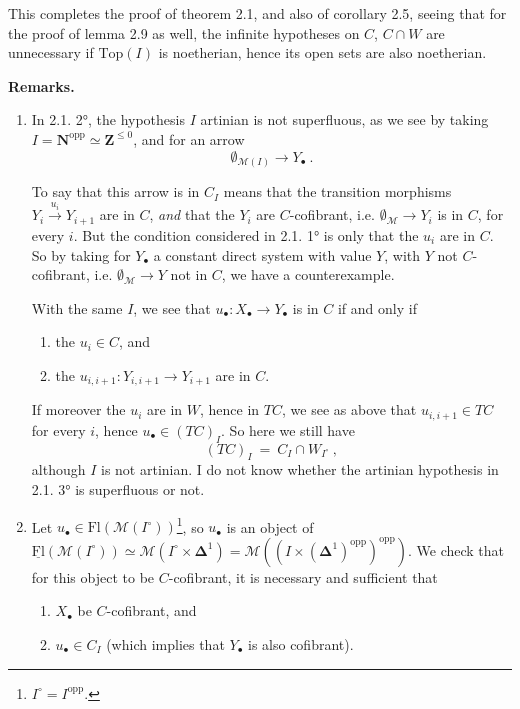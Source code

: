 \documentclass[11pt]{article}
\newcommand{\printedpage}[1]{\marginpar{\footnotesize p.~#1}}
\newcommand{\msp}[1]{\marginpar{\footnotesize [#1]}}
\newcommand{\M}{\mathcal{M}}
\begin{document}
This completes the proof of theorem 2.1, and also of corollary 2.5, seeing that for the proof of lemma 2.9 as well, the infinite hypotheses on $C$, $C \cap W$ are unnecessary if $\mathrm{Top}(I)$ is noetherian, hence its open sets are also noetherian.

\noindent\textbf{Remarks.}
\begin{enumerate}[leftmargin=2.5em]
\item[1)] In 2.1. 2°, the hypothesis $I$ artinian is not superfluous, as we see by taking $I = \mathbf{N}^{\mathrm{opp}} \simeq \mathbf{Z}^{\leq 0}$, \msp{38} and for an arrow %
\[ \emptyset_{\M(I)} \longrightarrow Y_\bullet\ . \]

To say that this arrow is in $C_I$ means that the transition morphisms $Y_i \xrightarrow{u_i} Y_{i+1}$ are in $C$, \textit{and} that the $Y_i$ are $C$-cofibrant, i.e. $\emptyset_{\M} \longrightarrow Y_i$ is in $C$, for every $i$. But the condition considered in 2.1. 1° is only that the $u_i$ are in $C$. So by taking for $Y_\bullet$ a constant direct system with value $Y$, with $Y$ not $C$-cofibrant, i.e. $\emptyset_{\M} \longrightarrow Y$ not in $C$, we have a counterexample.

With the same $I$, we see that $u_\bullet : X_\bullet \longrightarrow Y_\bullet$ is in $C$ if and only if
\begin{enumerate}[leftmargin=2.5em]
\item[a)] the $u_i \in C$, and
\item[b)] the $u_{i,i+1} : Y_{i,i+1} \longrightarrow Y_{i+1}$ are in $C$.
\end{enumerate}

\printedpage{21}

If moreover the $u_i$ are in $W$, hence in $TC$, we see as above that $u_{i,i+1} \in TC$ for every $i$, hence $u_\bullet \in (TC)_I$. So here we still have
\[ (TC)_I \ = \ C_I \cap W_{I^\circ}\ , \]
although $I$ is not artinian. I do not know whether the artinian hypothesis in 2.1. 3° is superfluous or not.
\item[2)] Let $u_\bullet \in \mathrm{Fl}(\M(I^\circ))$\footnote[13]{$I^\circ = I^{\mathrm{opp}}$.}, so $u_\bullet$ is an object of $\underline{\mathrm{Fl}}(\M(I^\circ)) \simeq \M(I^\circ \times \boldsymbol{\Delta}^1) = \M((I \times (\boldsymbol{\Delta}^1)^{\mathrm{opp}})^{\mathrm{opp}})$. We check that for this object to be $C$-cofibrant, it is necessary and sufficient that
\begin{enumerate}[leftmargin=2.5em]
\item[1°)] $X_\bullet$ be $C$-cofibrant, and
\item[2°)] $u_\bullet \in C_I$ (which implies that $Y_\bullet$ is also cofibrant).
\end{enumerate}
\end{enumerate}
\msp{39}
\end{document}
